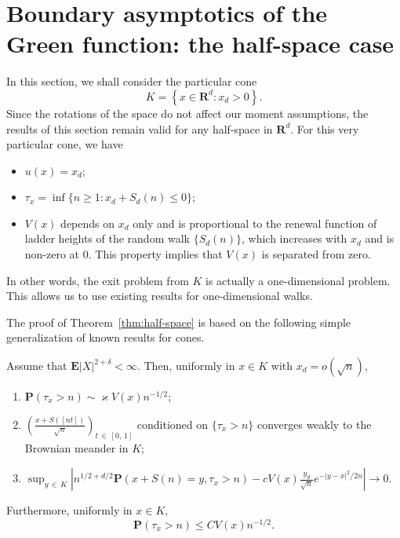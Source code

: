 \documentclass[AHL,Unicode,longabstracts,published]{cedram}
\newcommand{\pr}{\mathbf{P}}
\newcommand{\e}{\mathbf{E}}
\newcommand{\bfR}{\mathbf{R}}
\renewcommand{\le}{\leqslant}
\renewcommand{\ge}{\geqslant}
\newcommand*{\alphenumi}{\renewcommand*{\theenumi}{\alph{enumi}}}
\begin{document}
\section{Boundary asymptotics of the Green function: the half-space case}\label{sec:half-space}

In this section, we shall consider the particular cone
\[
K=\left\{x\in\bfR^d:x_d>0\right\}.
\]
Since the rotations of the space do not affect our moment assumptions, the results of this section remain valid for any half-space in $\bfR^d$. For this very particular cone, we have
\begin{itemize}
\item $u(x)=x_d$;
\item $\tau_x=\inf\{n\ge1:x_d+S_d(n)\le0\}$;
\item $V(x)$ depends on $x_d$ only and is proportional to the renewal function of ladder heights of the random walk $\{S_d(n)\}$, which increases with $x_d$ and is non-zero at $0$. This property implies that $V(x)$ is separated from zero.
\end{itemize}
In other words, the exit problem from $K$ is actually a one-dimensional problem. This allows us to use existing results for one-dimensional walks.



The proof of Theorem~\ref{thm:half-space} is based on the following simple generalization of known results for cones.
\begin{lemm}\label{lem:half-space}
Assume that $\e| X|^{2+\delta}<\infty$. Then, uniformly in $x\in K$ with $x_d=o(\sqrt{n})$,
\begin{enumerate}\alphenumi
\item\label{lem:it-a}
$\pr(\tau_x>n)\sim \varkappa V(x)n^{-1/2}$;
\item\label{lem:it-b}
$\left(\frac{x+S([nt])}{\sqrt{n}}\right)_{t\,\in\,[0,\,1]}$ conditioned on $\{\tau_x>n\}$ converges weakly to the Brownian meander in $K$;
\item\label{lem:it-c}
$\sup_{y\,\in\,K}\left| n^{1/2+d/2}\pr\left(x+S(n)=y,\tau_x>n\right)-cV(x)\frac{y_d}{\sqrt{n}}e^{-| y-x|^2/2n}\right|\to0$.
\end{enumerate}
Furthermore, uniformly in $x\in K$,
\[
\pr(\tau_x>n)\le C V(x)n^{-1/2}.
\]
\end{lemm}
\end{document}
